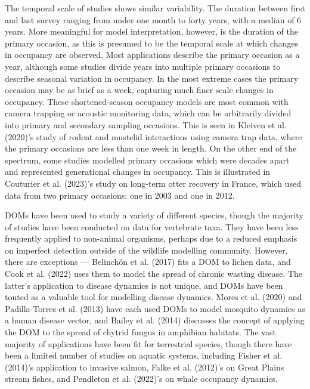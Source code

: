 \documentclass[
]{article}
\begin{document}
The temporal scale of studies shows similar variability. The duration
between first and last survey ranging from under one month to forty
years, with a median of 6 years. More meaningful for model
interpretation, however, is the duration of the primary occasion, as
this is presumed to be the temporal scale at which changes in occupancy
are observed. Most applications describe the primary occasion as a year,
although some studies divide years into multiple primary occasions to
describe seasonal variation in occupancy. In the most extreme cases the
primary occasion may be as brief as a week, capturing much finer scale
changes in occupancy. These shortened-season occupancy models are most
common with camera trapping or acoustic monitoring data, which can be
arbitrarily divided into primary and secondary sampling occasions. This
is seen in Kleiven et al. (2020)'s study of rodent and mustelid
interactions using camera trap data, where the primary occasions are
less than one week in length. On the other end of the spectrum, some
studies modelled primary occasions which were decades apart and
represented generational changes in occupancy. This is illustrated in
Couturier et al. (2023)'s study on long-term otter recovery in France,
which used data from two primary occasions: one in 2003 and one in 2012.

DOMs have been used to study a variety of different species, though the
majority of studies have been conducted on data for vertebrate taxa.
They have been less frequently applied to non-animal organisms, perhaps
due to a reduced emphasis on imperfect detection outside of the wildlife
modelling community. However, there are exceptions --- Belinchón et al.
(2017) fits a DOM to lichen data, and Cook et al. (2022) uses them to
model the spread of chronic wasting disease. The latter's application to
disease dynamics is not unique, and DOMs have been touted as a valuable
tool for modelling disease dynamics. Mores et al. (2020) and
Padilla-Torres et al. (2013) have each used DOMs to model mosquito
dynamics as a human disease vector, and Bailey et al. (2014) discusses
the concept of applying the DOM to the spread of chytrid fungus in
amphibian habitats. The vast majority of applications have been fit for
terrestrial species, though there have been a limited number of studies
on aquatic systems, including Fisher et al. (2014)'s application to
invasive salmon, Falke et al. (2012)'s on Great Plains stream fishes,
and Pendleton et al. (2022)'s on whale occupancy dynamics.
\end{document}
